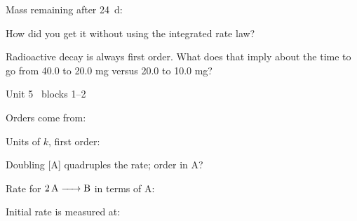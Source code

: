 \documentclass{apchem-worksheet}
\begin{document}
\begin{parts}
  \item Mass remaining after \SI{24}{\day}:
  \item How did you get it without using the integrated rate law?
  \item Radioactive decay is always first order. What does that imply about
        the time to go from 40.0 to 20.0 mg versus 20.0 to 10.0 mg?
\end{parts}

\begin{spiralstrip}{Unit 5 \textbullet\ blocks 1--2}
  \item Orders come from: 
  \item Units of $k$, first order: \answerblank[2.4cm]{\si{\per\second}}
  \item Doubling [A] quadruples the rate; order in A?
  \item Rate for $\ce{2A -> B}$ in terms of A:
  \item Initial rate is measured at: 
\end{spiralstrip}
\end{document}
